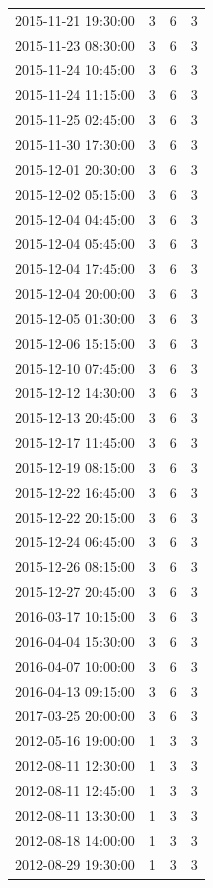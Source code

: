 \begin{tabular}{lrrr}
2015-11-21 19:30:00 & 3 & 6 & 3 \\
2015-11-23 08:30:00 & 3 & 6 & 3 \\
2015-11-24 10:45:00 & 3 & 6 & 3 \\
2015-11-24 11:15:00 & 3 & 6 & 3 \\
2015-11-25 02:45:00 & 3 & 6 & 3 \\
2015-11-30 17:30:00 & 3 & 6 & 3 \\
2015-12-01 20:30:00 & 3 & 6 & 3 \\
2015-12-02 05:15:00 & 3 & 6 & 3 \\
2015-12-04 04:45:00 & 3 & 6 & 3 \\
2015-12-04 05:45:00 & 3 & 6 & 3 \\
2015-12-04 17:45:00 & 3 & 6 & 3 \\
2015-12-04 20:00:00 & 3 & 6 & 3 \\
2015-12-05 01:30:00 & 3 & 6 & 3 \\
2015-12-06 15:15:00 & 3 & 6 & 3 \\
2015-12-10 07:45:00 & 3 & 6 & 3 \\
2015-12-12 14:30:00 & 3 & 6 & 3 \\
2015-12-13 20:45:00 & 3 & 6 & 3 \\
2015-12-17 11:45:00 & 3 & 6 & 3 \\
2015-12-19 08:15:00 & 3 & 6 & 3 \\
2015-12-22 16:45:00 & 3 & 6 & 3 \\
2015-12-22 20:15:00 & 3 & 6 & 3 \\
2015-12-24 06:45:00 & 3 & 6 & 3 \\
2015-12-26 08:15:00 & 3 & 6 & 3 \\
2015-12-27 20:45:00 & 3 & 6 & 3 \\
2016-03-17 10:15:00 & 3 & 6 & 3 \\
2016-04-04 15:30:00 & 3 & 6 & 3 \\
2016-04-07 10:00:00 & 3 & 6 & 3 \\
2016-04-13 09:15:00 & 3 & 6 & 3 \\
2017-03-25 20:00:00 & 3 & 6 & 3 \\
2012-05-16 19:00:00 & 1 & 3 & 3 \\
2012-08-11 12:30:00 & 1 & 3 & 3 \\
2012-08-11 12:45:00 & 1 & 3 & 3 \\
2012-08-11 13:30:00 & 1 & 3 & 3 \\
2012-08-18 14:00:00 & 1 & 3 & 3 \\
2012-08-29 19:30:00 & 1 & 3 & 3 \\

\end{tabular}
